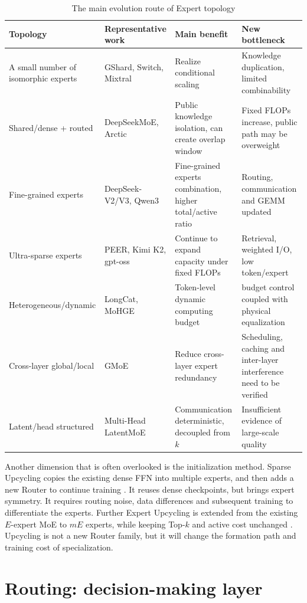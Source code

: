 \documentclass[10pt,a4paper,fontset=none]{ctexart}
\begin{document}
\begin{table}[htbp]
\centering
\caption{The main evolution route of Expert topology}
\label{tab:topology}
\small
\begin{tabularx}{\textwidth}{p{}p{}Y Y}
\toprule
Topology & Representative work & Main benefit & New bottleneck \\
\midrule
A small number of isomorphic experts & GShard, Switch, Mixtral & Realize conditional scaling & Knowledge duplication, limited combinability \\
Shared/dense + routed & DeepSeekMoE, Arctic & Public knowledge isolation, can create overlap window & Fixed FLOPs increase, public path may be overweight \\
Fine-grained experts & DeepSeek-V2/V3, Qwen3 & Fine-grained experts combination, higher total/active ratio & Routing, communication and GEMM updated \\
Ultra-sparse experts & PEER, Kimi K2, gpt-oss & Continue to expand capacity under fixed FLOPs & Retrieval, weighted I/O, low token/expert \\
Heterogeneous/dynamic & LongCat, MoHGE & Token-level dynamic computing budget & budget control coupled with physical equalization \\
Cross-layer global/local & GMoE & Reduce cross-layer expert redundancy & Scheduling, caching and inter-layer interference need to be verified \\
Latent/head structured & Multi-Head LatentMoE & Communication deterministic, decoupled from $k$ & Insufficient evidence of large-scale quality \\
\bottomrule
\end{tabularx}
\end{table}

Another dimension that is often overlooked is the initialization method. Sparse Upcycling copies the existing dense FFN into multiple experts, and then adds a new Router to continue training \cite{komatsuzaki2022upcycling}. It reuses dense checkpoints, but brings expert symmetry. It requires routing noise, data differences and subsequent training to differentiate the experts. Further Expert Upcycling is extended from the existing $E$-expert MoE to $mE$ experts, while keeping Top-$k$ and active cost unchanged \cite{expertUpcycling2026}. Upcycling is not a new Router family, but it will change the formation path and training cost of specialization.

\section{Routing: decision-making layer}
\end{document}
